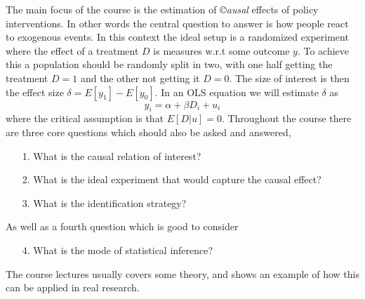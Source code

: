 The main focus of the course is the estimation of \textit{©ausal} effects of policy interventions. In other words the central question to answer is how people react to exogenous events. In this context the ideal setup is a randomized experiment where the effect of a treatment $D$ is measures w.r.t some outcome $y$. To achieve this a population should be randomly split in two, with one half getting the treatment $D=1$ and the other not getting it $D=0$. The size of interest is then the effect size $\delta = E[y_1]- E[y_0]$. In an OLS equation we will estimate $\delta$ as
\begin{equation}
y_i = \alpha + \beta D_i + u_i
\end{equation}
where the critical assumption is that $E[D|u]=0$. Throughout the course there are three core questions which should also be asked and answered,
\begin{itemize}
\item[1.] What is the causal relation of interest?
\item[2.] What is the ideal experiment that would capture the causal effect?
\item[3.] What is the identification strategy?
\end{itemize}
As well as a fourth question which is good to consider
\begin{itemize}
\item[4.] What is the mode of statistical inference?
\end{itemize}
The course lectures usually covers some theory, and shows an example of how this can be applied in real research.
